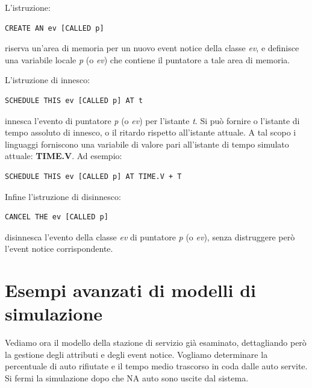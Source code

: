 \documentclass[11pt]{book}
\begin{document}
L'istruzione:

\begin{verbatim}
CREATE AN ev [CALLED p] 
\end{verbatim}

riserva un'area di memoria per un nuovo event notice della classe {\em
  ev}, e definisce una variabile locale {\em p} (o {\em ev}) che
contiene il puntatore a tale area di memoria.

L'istruzione di innesco:

\begin{verbatim}
SCHEDULE THIS ev [CALLED p] AT t 
\end{verbatim}

innesca l'evento di puntatore {\em p} (o {\em ev}) per l'istante {\em
  t}. Si pu\`o fornire o l'istante di tempo assoluto di innesco, o il
ritardo rispetto all'istante attuale. A tal scopo i linguaggi
forniscono una variabile di valore pari all'istante di tempo simulato
attuale: {\bf TIME.V}. Ad esempio:

\begin{verbatim}
SCHEDULE THIS ev [CALLED p] AT TIME.V + T 
\end{verbatim}

Infine l'istruzione di disinnesco:

\begin{verbatim}
CANCEL THE ev [CALLED p] 
\end{verbatim}

disinnesca l'evento della classe {\em ev} di puntatore {\em p} (o {\em
  ev}), senza distruggere per\`o l'event notice corrispondente.

\section{Esempi avanzati di modelli di simulazione}
Vediamo ora il modello della stazione di servizio gi\`a esaminato,
dettagliando per\`o la gestione degli attributi e degli event
notice. Vogliamo determinare la percentuale di auto rifiutate e il
tempo medio trascorso in coda dalle auto servite. Si fermi la
simulazione dopo che NA auto sono uscite dal sistema. 
\end{document}
